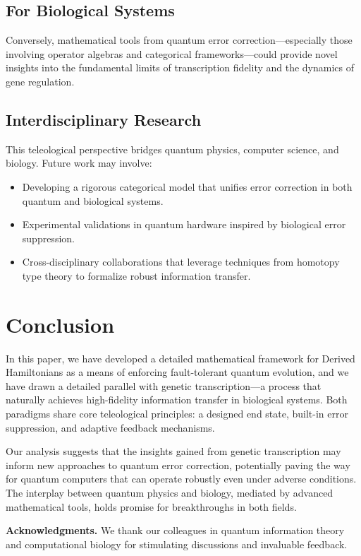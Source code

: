 \documentclass[11pt]{article}
\begin{document}
\subsection{For Biological Systems}
Conversely, mathematical tools from quantum error correction—especially those involving operator algebras and categorical frameworks—could provide novel insights into the fundamental limits of transcription fidelity and the dynamics of gene regulation.

\subsection{Interdisciplinary Research}
This teleological perspective bridges quantum physics, computer science, and biology. Future work may involve:
\begin{itemize}
    \item Developing a rigorous categorical model that unifies error correction in both quantum and biological systems.
    \item Experimental validations in quantum hardware inspired by biological error suppression.
    \item Cross-disciplinary collaborations that leverage techniques from homotopy type theory to formalize robust information transfer.
\end{itemize}

\section{Conclusion}
In this paper, we have developed a detailed mathematical framework for Derived Hamiltonians as a means of enforcing fault-tolerant quantum evolution, and we have drawn a detailed parallel with genetic transcription—a process that naturally achieves high-fidelity information transfer in biological systems. Both paradigms share core teleological principles: a designed end state, built-in error suppression, and adaptive feedback mechanisms.

Our analysis suggests that the insights gained from genetic transcription may inform new approaches to quantum error correction, potentially paving the way for quantum computers that can operate robustly even under adverse conditions. The interplay between quantum physics and biology, mediated by advanced mathematical tools, holds promise for breakthroughs in both fields.

\medskip
\noindent\textbf{Acknowledgments.} We thank our colleagues in quantum information theory and computational biology for stimulating discussions and invaluable feedback.
\end{document}
